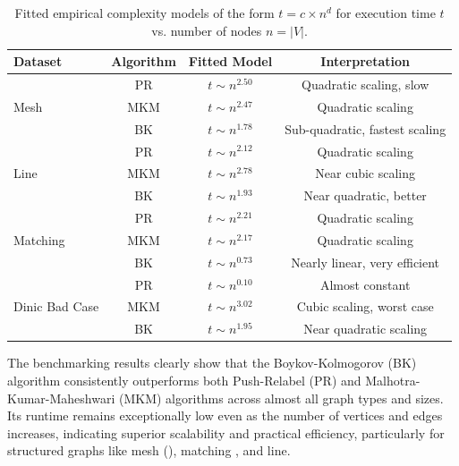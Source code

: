 \begin{table}[H]
\centering
\small
\begin{tabular}{lccc}
\toprule
\textbf{Dataset} & \textbf{Algorithm} & \textbf{Fitted Model} & \textbf{Interpretation} \\
\midrule
\multirow{3}{*}{Mesh} 
  & PR  & $t \sim n^{2.50}$ & Quadratic scaling, slow \\
  & MKM & $t \sim n^{2.47}$ & Quadratic scaling \\
  & BK  & $t \sim n^{1.78}$ & Sub-quadratic, fastest scaling \\
  
\midrule
\multirow{3}{*}{Line} 
  & PR  & $t \sim n^{2.12}$ & Quadratic scaling \\
  & MKM & $t \sim n^{2.78}$ & Near cubic scaling \\
  & BK  & $t \sim n^{1.93}$ & Near quadratic, better \\
  
\midrule
\multirow{3}{*}{Matching} 
  & PR  & $t \sim n^{2.21}$ & Quadratic scaling \\
  & MKM & $t \sim n^{2.17}$ & Quadratic scaling \\
  & BK  & $t \sim n^{0.73}$ & Nearly linear, very efficient \\
  
\midrule
\multirow{3}{*}{Dinic Bad Case} 
  & PR  & $t \sim n^{0.10}$ & Almost constant \\
  & MKM & $t \sim n^{3.02}$ & Cubic scaling, worst case \\
  & BK  & $t \sim n^{1.95}$ & Near quadratic scaling \\
  
\bottomrule
\end{tabular}
\caption{Fitted empirical complexity models of the form $t = c \times n^{d}$ for execution time $t$ vs. number of nodes $n = |V|$.}
\label{tab:complexity_fits}
\end{table}


The benchmarking results clearly show that the Boykov-Kolmogorov (BK) algorithm consistently outperforms both Push-Relabel (PR) and Malhotra-Kumar-Maheshwari (MKM) algorithms across almost all graph types and sizes. Its runtime remains exceptionally low even as the number of vertices and edges increases, indicating superior scalability and practical efficiency, particularly for structured graphs like mesh (), matching , and line.

